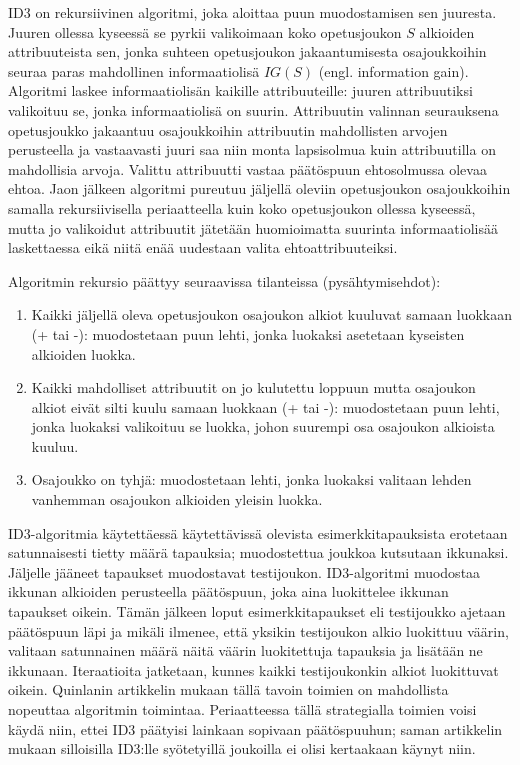 \documentclass[12pt,finnish]{tktltiki2}
\theoremstyle{definition}
\theoremstyle{remark}
\begin{document}
ID3 on rekursiivinen algoritmi, joka aloittaa puun muodostamisen sen juuresta. Juuren ollessa kyseessä se pyrkii
valikoimaan koko opetusjoukon $S$ alkioiden attribuuteista sen, jonka suhteen opetusjoukon jakaantumisesta
osajoukkoihin seuraa paras mahdollinen informaatiolisä $IG(S)$ (engl. information gain). Algoritmi laskee
informaatiolisän kaikille attribuuteille: juuren attribuutiksi valikoituu se, jonka informaatiolisä
on suurin. Attribuutin valinnan seurauksena opetusjoukko jakaantuu osajoukkoihin attribuutin mahdollisten arvojen
perusteella ja vastaavasti juuri saa niin monta lapsisolmua kuin attribuutilla on mahdollisia arvoja. Valittu
attribuutti vastaa päätöspuun ehtosolmussa olevaa ehtoa. Jaon jälkeen algoritmi pureutuu jäljellä oleviin
opetusjoukon osajoukkoihin samalla rekursiivisella periaatteella kuin koko opetusjoukon ollessa kyseessä, mutta jo valikoidut
attribuutit jätetään huomioimatta suurinta informaatiolisää laskettaessa eikä niitä enää uudestaan valita
ehtoattribuuteiksi.

Algoritmin rekursio päättyy seuraavissa tilanteissa (pysähtymisehdot): 
\begin{enumerate}
  \item Kaikki jäljellä oleva opetusjoukon osajoukon alkiot kuuluvat samaan luokkaan (+ tai -): muodostetaan puun lehti, jonka luokaksi
  asetetaan kyseisten alkioiden luokka.
  \item Kaikki mahdolliset attribuutit on jo kulutettu loppuun mutta osajoukon alkiot eivät silti kuulu samaan luokkaan (+ tai -): muodostetaan puun lehti,
  jonka luokaksi valikoituu se luokka, johon suurempi osa osajoukon alkioista kuuluu.
  \item Osajoukko on tyhjä: muodostetaan lehti, jonka luokaksi valitaan lehden vanhemman osajoukon alkioiden yleisin luokka.
\end{enumerate}

ID3-algoritmia käytettäessä käytettävissä olevista esimerkkitapauksista erotetaan satunnaisesti tietty määrä tapauksia; muodostettua
joukkoa kutsutaan ikkunaksi. Jäljelle jääneet tapaukset muodostavat testijoukon. ID3-algoritmi muodostaa ikkunan alkioiden
perusteella päätöspuun, joka aina luokittelee ikkunan tapaukset oikein. Tämän jälkeen loput esimerkkitapaukset eli testijoukko ajetaan
päätöspuun läpi ja mikäli ilmenee, että yksikin testijoukon alkio luokittuu väärin, valitaan satunnainen määrä näitä väärin
luokitettuja tapauksia ja lisätään ne ikkunaan. Iteraatioita jatketaan, kunnes kaikki testijoukonkin alkiot luokittuvat oikein.
Quinlanin artikkelin mukaan \cite{quinlan} tällä tavoin toimien on mahdollista nopeuttaa algoritmin toimintaa. Periaatteessa tällä
strategialla toimien voisi käydä niin, ettei ID3 päätyisi lainkaan sopivaan päätöspuuhun; saman artikkelin
mukaan silloisilla ID3:lle syötetyillä joukoilla ei olisi kertaakaan käynyt niin.
\end{document}
